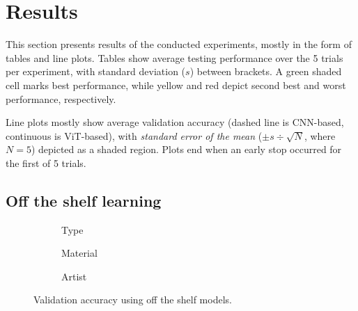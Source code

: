 \section{Results}

This section presents results of the conducted experiments, mostly in the form of tables and line plots. Tables show average testing performance over the 5 trials per experiment, with standard deviation ($s$) between brackets. A green shaded cell marks best performance, while yellow and red depict second best and worst performance, respectively.

Line plots mostly show average validation accuracy (dashed line is CNN-based, continuous is ViT-based), with \textit{standard error of the mean} ($\pm s \div \sqrt{N}$, where $N=5$) depicted as a shaded region. Plots end when an early stop occurred for the first of 5 trials.



\subsection{Off the shelf learning} \label{results:ots}

\begin{figure}
    \centering
    \begin{subfigure}{0.32\textwidth}
    \def\svgwidth{5.5cm}
    
    \caption{Type}
    \label{results:img:ots_type}
    \end{subfigure}
    \hfill
    \begin{subfigure}{0.32\textwidth}
    \def\svgwidth{5.5cm}
    
    \caption{Material}
    \label{results:img:ots_mat}
    \end{subfigure}
    \hfill
    \begin{subfigure}{0.32\textwidth}
    \def\svgwidth{5.5cm}
    
    \caption{Artist}
    \label{results:img:ots_artist}
    \end{subfigure}
    \caption{Validation accuracy using off the shelf models.}
    \label{results:img:ots}
\end{figure}

